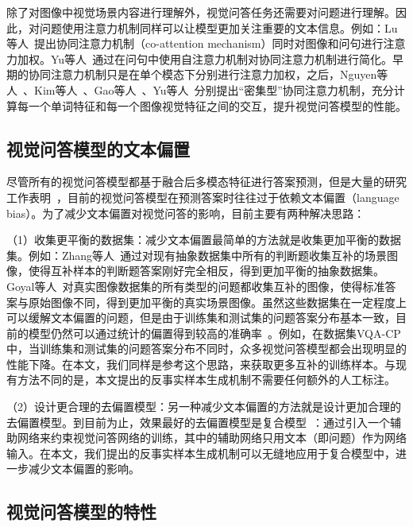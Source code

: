 除了对图像中视觉场景内容进行理解外，视觉问答任务还需要对问题进行理解。因此，对问题使用注意力机制同样可以让模型更加关注重要的文本信息。例如：Lu等人~\cite{lu2017hierarchical}提出协同注意力机制（co-attention mechanism）同时对图像和问句进行注意力加权。Yu等人~\cite{yu2018beyond}通过在问句中使用自注意力机制对协同注意力机制进行简化。早期的协同注意力机制只是在单个模态下分别进行注意力加权，之后，Nguyen等人~\cite{nguyen2018improved}、Kim等人~\cite{kim2018bilinear}、Gao等人~\cite{gao2019dynamic}、Yu等人~\cite{yu2019deep}分别提出“密集型”协同注意力机制，充分计算每一个单词特征和每一个图像视觉特征之间的交互，提升视觉问答模型的性能。


\subsection{视觉问答模型的文本偏置}

尽管所有的视觉问答模型都基于融合后多模态特征进行答案预测，但是大量的研究工作表明~\cite{jabri2016revisiting,agrawal2016analyzing,zhang2016yin,goyal2017making}，目前的视觉问答模型在预测答案时往往过于依赖文本偏置（language bias）。为了减少文本偏置对视觉问答的影响，目前主要有两种解决思路：

（1）收集更平衡的数据集：减少文本偏置最简单的方法就是收集更加平衡的数据集。例如：Zhang等人~\cite{zhang2016yin}通过对现有抽象数据集中所有的判断题收集互补的场景图像，使得互补样本的判断题答案刚好完全相反，得到更加平衡的抽象数据集。Goyal等人~\cite{goyal2017making}对真实图像数据集的所有类型的问题都收集互补的图像，使得标准答案与原始图像不同，得到更加平衡的真实场景图像。虽然这些数据集在一定程度上可以缓解文本偏置的问题，但是由于训练集和测试集的问题答案分布基本一致，目前的模型仍然可以通过统计的偏置得到较高的准确率~\cite{agrawal2018don}。例如，在数据集VQA-CP中，当训练集和测试集的问题答案分布不同时，众多视觉问答模型都会出现明显的性能下降。在本文，我们同样是参考这个思路，来获取更多互补的训练样本。与现有方法不同的是，本文提出的反事实样本生成机制不需要任何额外的人工标注。

（2）设计更合理的去偏置模型：另一种减少文本偏置的方法就是设计更加合理的去偏置模型。到目前为止，效果最好的去偏置模型是复合模型~\cite{ramakrishnan2018overcoming,grand2019adversarial,belinkov2019don,cadene2019rubi,clark2019don,mahabadi2019simple}：通过引入一个辅助网络来约束视觉问答网络的训练，其中的辅助网络只用文本（即问题）作为网络输入。在本文，我们提出的反事实样本生成机制可以无缝地应用于复合模型中，进一步减少文本偏置的影响。


\subsection{视觉问答模型的特性}

